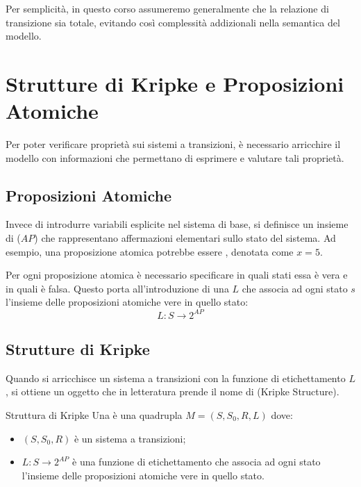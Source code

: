 Per semplicità, in questo corso assumeremo generalmente che la relazione di transizione sia totale, evitando così complessità addizionali nella semantica del modello.

\section{Strutture di Kripke e Proposizioni Atomiche}

Per poter verificare proprietà sui sistemi a transizioni, è necessario arricchire il modello con informazioni che permettano di esprimere e valutare tali proprietà.

\subsection{Proposizioni Atomiche}

Invece di introdurre variabili esplicite nel sistema di base, si definisce un insieme di  (\(AP\)) che rappresentano affermazioni elementari sullo stato del sistema. Ad esempio, una proposizione atomica potrebbe essere , denotata come \(x=5\).

Per ogni proposizione atomica è necessario specificare in quali stati essa è vera e in quali è falsa. Questo porta all'introduzione di una  \(L\) che associa ad ogni stato \(s\) l'insieme delle proposizioni atomiche vere in quello stato:
\[L: S \rightarrow 2^{AP}\]

\subsection{Strutture di Kripke}

Quando si arricchisce un sistema a transizioni con la funzione di etichettamento \(L\), si ottiene un oggetto che in letteratura prende il nome di  (Kripke Structure).

\begin{definition}{Struttura di Kripke}
  Una  è una quadrupla \(M=(S, S_0, R, L)\) dove:
  \begin{itemize}
    \item \((S, S_0, R)\) è un sistema a transizioni;
    \item \(L: S \rightarrow 2^{AP}\) è una funzione di etichettamento che associa ad ogni stato l'insieme delle proposizioni atomiche vere in quello stato.
  \end{itemize}
\end{definition}

